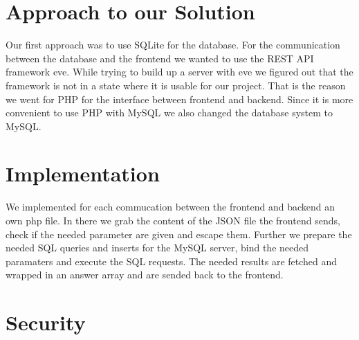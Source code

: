 

\section{Approach to our Solution}
Our first approach was to use SQLite for the database. For the communication between the database and the frontend we wanted to use the REST API framework eve\cite{python-eve}. While trying to build up a server with eve we figured out that the framework is not in a state where it is usable for our project. That is the reason we went for PHP for the interface between frontend and backend. Since it is more convenient to use PHP with MySQL we also changed the database system to MySQL.

\section{Implementation}
We implemented for each commucation between the frontend and backend an own php file. In there we grab the content of the JSON file the frontend sends, check if the needed parameter are given and escape them. Further we prepare the needed SQL queries and inserts for the MySQL server, bind the needed paramaters and execute the SQL requests. The needed results are fetched and wrapped in an answer array and are sended back to the frontend.

\section{Security}
\lipsum

